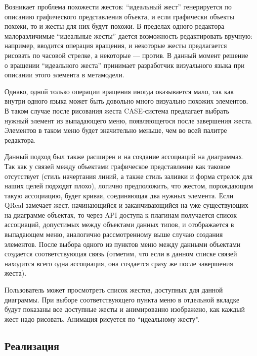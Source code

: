 \documentclass[a5paper]{article}
\begin{document}
Возникает проблема похожести жестов: ``идеальный жест'' генерируется по описанию графического представления объекта, и если графически объекты похожи, то и жесты для них будут похожи. В пределах одного редактора малоразличимые ``идеальные жесты'' дается возможность редактировать вручную: например, вводится операция вращения, и некоторые жесты предлагается рисовать по часовой стрелке, а некоторые --- против. В данный момент решение о вращении ``идеального жеста'' принимает разработчик визуального языка при описании этого элемента в метамодели. 

Однако, одной только операции вращения иногда оказывается мало, так как внутри одного языка может быть довольно много визуально похожих элементов. В таком случае после рисования жеста CASE-система предлагает выбрать нужный элемент из выпадающего меню, появляющегося после завершения жеста. Элементов в таком меню будет значительно меньше, чем во всей палитре редактора.

Данный подход был также расширен и на создание ассоциаций на диаграммах. Так как у связей между объектами графическое представление как таковое отсутствует (стиль начертания линий, а также стиль заливки и форма стрелок для наших целей подходят плохо), логично 
предположить, что жестом, порождающим такую ассоциацию, будет кривая, соединяющая два нужных элемента. Если QReal замечает жест, начинающийся и заканчивающийся на уже существующих на диаграмме объектах, то через API доступа к плагинам получается список 
ассоциаций, допустимых между объектами данных типов, и отображается в выпадающем меню, аналогично рассмотренному выше случаю создания элементов. После выбора одного из пунктов меню между данными объектами создается соответствующая связь (отметим, что если в данном списке связей находится всего одна ассоциация, она создается сразу же после завершения жеста).

Пользователь может просмотреть список жестов, доступных для данной диаграммы. При выборе соответствующего пункта меню в отдельной вкладке будут показаны все доступные жесты и анимированно изображено, как каждый жест надо рисовать. Анимация рисуется по ``идеальному жесту''.

\subsection{Реализация}
\end{document}
